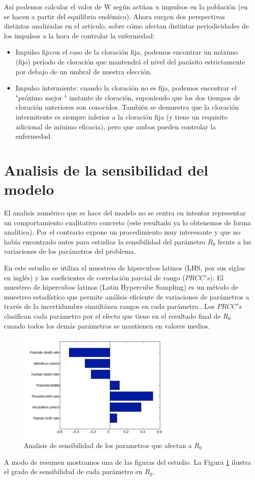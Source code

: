 \documentclass[1p]{elsarticle}
\begin{document}
Así podemos calcular el valor de W según actúan $n$ impulsos en la población (en \cite{original} se hacen a partir del equilibrio endémico). Ahora surgen dos perspectivas distintas analizadas en el artículo, sobre cómo afectan distintas periodicidades de los impulsos a la hora de controlar la enfermedad:
\begin{itemize}
	\item Impulso fijo:en el caso de la cloración fija, podemos encontrar un máximo
	(fijo) período de cloración que mantendrá el nivel del parásito estrictamente por debajo de un
	umbral de nuestra elección.
	\item Impulso intermiente: cuando la cloración no es fija, podemos encontrar el "próximo
	mejor " instante de cloración, suponiendo que los dos tiempos de cloración anteriores son
	conocidos. También se demuestra que la cloración intermitente es siempre
	inferior a la cloración fija (y tiene un requisito adicional de mínimo
	eficacia), pero que ambos pueden controlar la enfermedad.
\end{itemize}
\section{Analisis de la sensibilidad del modelo}\label{inter}
El analisis numérico que se hace del modelo no se centra en intentar representar un comportamiento cualitativo concreto (este resultado ya lo obtenemos de forma analítica). Por el contrario expone un procedimiento muy interesante y que no había encontrado antes para estudiar la sensibilidad del parámetro $R_0$ frente a las variaciones de los parámetros del problema. 

En este estudio se utiliza el muestreo de hipercubos latinos (LHS, por sus siglas en inglés) y los coeficientes de correlación parcial de rango ($PRCC's$). El muestreo de hipercubos latinos (Latin Hypercube Sampling) es un método de muestreo estadístico que permite
análisis eficiente de variaciones de parámetros a través de la incertidumbre simultánea
rangos en cada parámetro.. Los $PRCC's$ clasifican cada parámetro por el efecto que tiene
en el resultado final de $R_0$ cuando todos los demás parámetros se mantienen en valores medios.
\begin{figure}
	\centering
	\includegraphics[width=0.7\textwidth]{fig1.png}
	\caption{Analisis de sensibilidad de los parametros que afectan a $R_0$ }
	\label{fig:1}
\end{figure}
A modo de resumen mostramos una de las figuras del estudio. La Figura \ref{fig:1} ilustra el grado de sensibilidad de cada parámetro en $R_0$.
\end{document}

